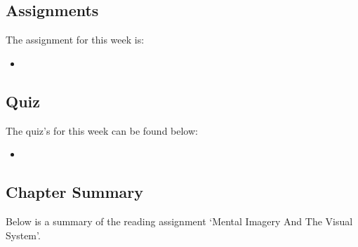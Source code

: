 \subsection{Assignments}

The assignment for this week is:

\begin{itemize}
    \item {}
\end{itemize}

\subsection{Quiz}

The quiz's for this week can be found below:

\begin{itemize}
    \item {}
\end{itemize}

\newpage

\subsection{Chapter Summary}

Below is a summary of the reading assignment `Mental Imagery And The Visual System'.

